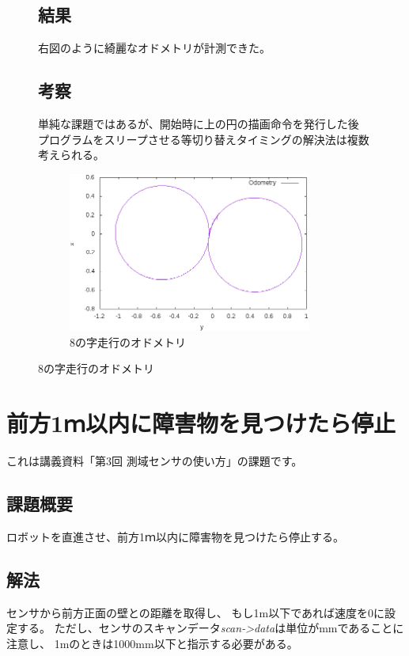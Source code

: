 \documentclass[main]{subfiles}
\begin{document}
\begin{figure}[H]
	\begin{minipage}{0.5\hsize}
		\setlength{\parindent}{1\Cwd}
		\section{結果}
		右図のように綺麗なオドメトリが計測できた。

		\section{考察}
		単純な課題ではあるが、開始時に上の円の描画命令を発行した後
		プログラムをスリープさせる等切り替えタイミングの解決法は複数考えられる。
	\end{minipage}
	\begin{minipage}{0.5\hsize}
		\begin{figure}[H]
			\centering
			\includegraphics[width=8cm]{img/eight.png}
			\caption{8の字走行のオドメトリ}
		\end{figure}
	\end{minipage}
\end{figure}

\chapter{前方1ｍ以内に障害物を見つけたら停止}

これは講義資料「第3回 測域センサの使い方」の課題です。

\section{課題概要}
ロボットを直進させ、前方1ｍ以内に障害物を見つけたら停止する。

\section{解法}
センサから前方正面の壁との距離を取得し、
もし1m以下であれば速度を0に設定する。
ただし、センサのスキャンデータ\textit{scan->data}は単位がmmであることに注意し、
1mのときは1000mm以下と指示する必要がある。
\end{document}
